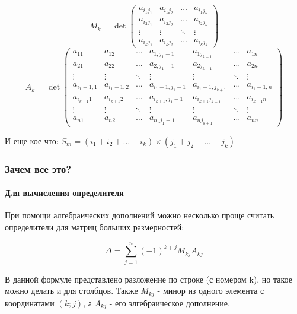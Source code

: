 \documentclass[class=article,a4paper,12pt,crop=false]{standalone}
\begin{document}
\begin{equation}
  M_k = \det{
    \begin{pmatrix}
      a_{i_1j_1} & a_{i_1j_2} & \dots & a_{i_1j_k} \\
      a_{i_2j_1} & a_{i_2j_2} & \dots & a_{i_2j_k} \\
      \vdots & \vdots & \ddots & \vdots \\
      a_{i_kj_1} & a_{i_kj_2} & \dots & a_{i_kj_k}
    \end{pmatrix}
  }
\end{equation}
\begin{equation}
  A_k =\det{
    \begin{pmatrix}
      a_{11} & a_{12} & \dots & a_{1,j_1-1} & a_{1j_{k+1}} & \dots & a_{1n} \\
      a_{21} & a_{22} & \dots & a_{2,j_1-1} & a_{2j_{k+1}} & \dots & a_{2n} \\
      \vdots & \vdots & \ddots & \vdots & \vdots & \ddots & \vdots \\
      a_{i_1-1,1} & a_{i_1-1,2} & \dots & a_{i_1-1,j_1-1} & a_{i_1-1,j_{k+1}} & \dots & a_{i_1-1,n} \\
      a_{i_{k+1}1} & a_{i_{k+1}2} & \dots & a_{i_{k+1},j_1-1} & a_{i_{k+1}j_{k+1}} & \dots & a_{i_{k+1}n} \\
      \vdots & \vdots & \ddots & \vdots & \vdots & \ddots & \vdots \\
      a_{n1} & a_{n2} & \dots & a_{n,j_1-1} & a_{nj_{k+1}} & \dots & a_{nn}
    \end{pmatrix}
  }
\end{equation}

И еще кое-что: $S_m = (i_1+i_2+\dots+i_k) \times (j_1+j_2+\dots+j_k)$

\subsubsection{Зачем все это?}

\paragraph{Для вычисления определителя}

При помощи алгебраических дополнений можно несколько проще считать определители для
матриц больших размерностей:

\begin{equation}
  \Delta = \sum\limits_{j=1}^{n}(-1)^{k+j}M_{kj}A_{kj}
\end{equation}

В данной формуле представлено разложение по строке (с номером k), но такое можно
делать и для столбцов. Также $M_{kj}$ - минор из одного элемента с координатами $(k; j)$,
а $A_{kj}$ - его элгебраическое дополнение.
\end{document}
